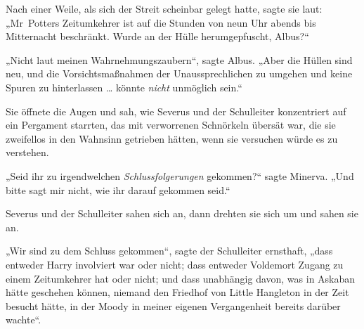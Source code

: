 Nach einer Weile, als sich der Streit scheinbar gelegt hatte, sagte sie laut:
„Mr~Potters Zeitumkehrer ist auf die Stunden von neun Uhr abends bis Mitternacht beschränkt. Wurde an der Hülle herumgepfuscht, Albus?“

„Nicht laut meinen Wahrnehmungszaubern“, sagte Albus.
„Aber die Hüllen sind neu, und die Vorsichtsmaßnahmen der Unaussprechlichen zu umgehen und keine Spuren zu hinterlassen … könnte \emph{nicht} unmöglich sein.“

Sie öffnete die Augen und sah, wie Severus und der Schulleiter konzentriert auf ein Pergament starrten, das mit verworrenen Schnörkeln übersät war, die sie zweifellos in den Wahnsinn getrieben hätten, wenn sie versuchen würde es zu verstehen.

„Seid ihr zu irgendwelchen \emph{Schlussfolgerungen} gekommen?“ sagte Minerva.
„Und bitte sagt mir nicht, wie ihr darauf gekommen seid.“

Severus und der Schulleiter sahen sich an, dann drehten sie sich um und sahen sie an.

„Wir sind zu dem Schluss gekommen“, sagte der Schulleiter ernsthaft, „dass entweder Harry involviert war oder nicht; dass entweder Voldemort Zugang zu einem Zeitumkehrer hat oder nicht; und dass unabhängig davon, was in Askaban hätte geschehen können, niemand den Friedhof von Little Hangleton in der Zeit besucht hätte, in der Moody in meiner eigenen Vergangenheit bereits darüber wachte“.

